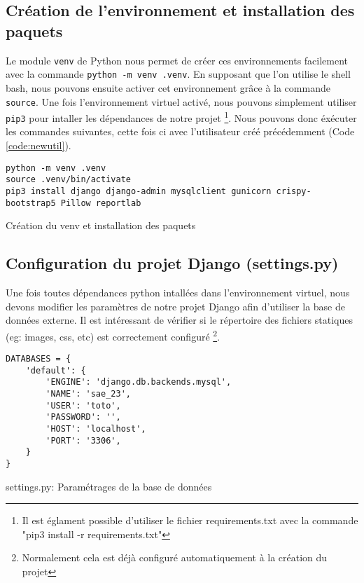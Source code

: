 \documentclass{article}
\begin{document}
        \subsection{Création de l'environnement et installation des paquets}
        Le module \verb|venv| de Python nous permet de créer ces environnements facilement avec la commande \verb|python -m venv .venv|. En supposant que l'on utilise le shell bash, nous pouvons ensuite activer cet environnement grâce à la commande \verb|source|.
        Une fois l'environnement virtuel activé, nous pouvons simplement utiliser \verb|pip3| pour intaller les dépendances de notre projet \footnote{\label{note2}Il est églament possible d'utiliser le fichier requirements.txt avec la commande "pip3 install -r requirements.txt"}. 
        Nous pouvons donc éxécuter les commandes suivantes, cette fois ci avec l'utilisateur créé précédemment (Code \ref{code:newutil}). 
        \begin{listing}[H]
            \begin{verbatim}
python -m venv .venv
source .venv/bin/activate
pip3 install django django-admin mysqlclient gunicorn crispy-bootstrap5 Pillow reportlab
            \end{verbatim}
            \caption{Création du venv et installation des paquets}
            \label{code:creation-venv}
        \end{listing}
        
        \subsection{Configuration du projet Django (settings.py)}
        Une fois toutes dépendances python intallées dans l'environnement virtuel, nous devons modifier les paramètres de notre projet Django afin d'utiliser la base de données externe. Il est intéressant de vérifier si le répertoire des fichiers statiques (eg: images, css, etc) est correctement configuré
        \footnote{\label{note3}Normalement cela est déjà configuré automatiquement à la création du projet}. 
        \begin{listing}[H]
            \begin{verbatim}
DATABASES = {
    'default': {
        'ENGINE': 'django.db.backends.mysql',
        'NAME': 'sae_23',
        'USER': 'toto',
        'PASSWORD': '',
        'HOST': 'localhost',
        'PORT': '3306',
    }
}
            \end{verbatim}
            \caption{settings.py: Paramétrages de la base de données}
            \label{code:settings.py-db}
        \end{listing}
        
\end{document}
